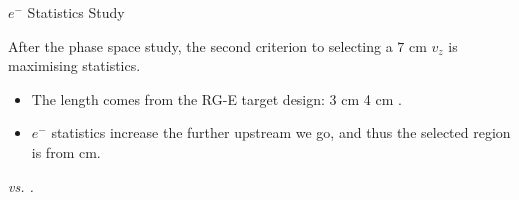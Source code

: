 \begin{frame}{$e^-$ Statistics Study}
    \label{12.21::e-_statistics_study}

    After the phase space study, the second criterion to selecting a \textcolor{efd_green}{$7$ cm $v_z$}  is maximising statistics.

    \begin{itemize}
        \item
            The length comes from the RG-E target design: \textcolor{efd_green}{3 cm}  \textcolor{efd_green}{4 cm} .

        \item
            $e^-$ statistics increase the further upstream we go, and thus the selected region is from  \textcolor{efd_green}{cm}.
    \end{itemize}

    \begin{center}
        \begin{figure}[t]
        \end{figure}
        \scriptsize{\textit{ vs. .}}
    \end{center}
\end{frame}

